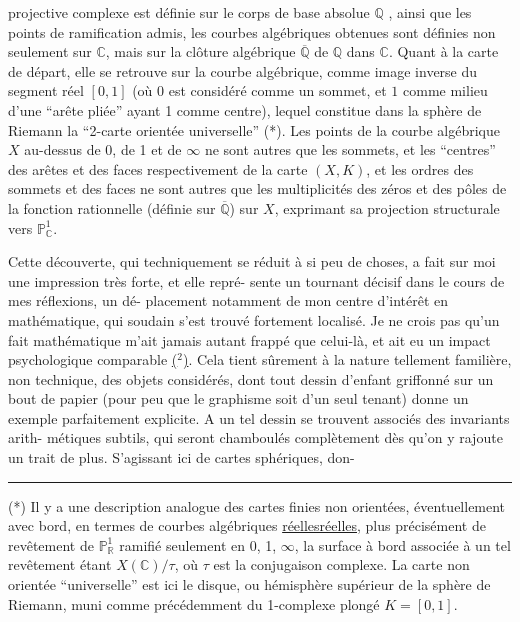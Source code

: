 \documentclass[11pt,a4paper]{article}
\makeatletter
\newif\ifdiplomatic
\newif\ifreading
\def\CurrentApparatus{}
\newcounter{appnote}
\let\TextUline\uline
\renewcommand{\uline}[1]{\ifmmode\underline{#1}\else\TextUline{#1}\fi}
\newcommand{\AppItem}[2]{%
  \ifcsdef{edvariant@#2}{%
    \ifcsempty{edvariant@#2}{\PackageError{Esquisse}{Empty apparatus entry #2}{Every executed apparatus marker requires its printed note.}}{}%
  }{\PackageError{Esquisse}{Undefined apparatus entry #2}{Every executed apparatus marker requires its printed note.}}%
  \typeout{EDITION-APP-ENTRY: #2; NUMBER: #1}%
  \par\noindent\textsuperscript{#1}\csname edvariant@#2\endcsname}
\newcommand{\EditionApp}[1]{%
  \stepcounter{appnote}%
  \ifmmode{}^{\scriptscriptstyle\theappnote}\else\textsuperscript{\theappnote}\fi
  \begingroup\edef\x{\endgroup\noexpand\gappto\noexpand\CurrentApparatus{\noexpand\AppItem{\theappnote}{#1}}}\x}
\newcommand{\var}[4]{\ifdiplomatic#1\else#2\ifreading\else\EditionApp{#4}\fi\fi}
\newcommand{\notecall}[3]{\hypertarget{#2}{\hyperlink{note-#1}{#3}}}
\makeatother
\begin{document}
projective complexe est définie sur le corps de base absolue $\mathbb{Q}$ ,
ainsi que les points de ramification admis, les courbes algébriques
obtenues sont définies non seulement sur $\mathbb{C}$, mais sur la clôture
algébrique $\overline{\mathbb{Q}}$ de $\mathbb{Q}$ dans $\mathbb{C}$. Quant à la carte de départ, elle se
retrouve sur la courbe algébrique, comme image inverse du segment
réel $[0,1]$ (où $0$ est considéré comme un sommet, et $1$ comme
milieu d'une ``arête pliée'' ayant 1 comme centre), lequel constitue
dans la sphère de Riemann la ``2-carte orientée universelle'' (*).
Les points de la courbe algébrique $X$ au-dessus de 0, de 1 et de $\infty$
ne sont autres que les sommets, et les ``centres'' des arêtes et des
faces respectivement de la carte $(X,K)$, et les ordres des sommets
et des faces ne sont autres que les multiplicités des zéros et
des pôles de la fonction rationnelle (définie sur $\overline{\mathbb{Q}}$) sur $X$,
exprimant sa projection structurale vers $\mathbb{P}^1_{\mathbb{C}}$.

Cette découverte, qui techniquement se réduit à si peu
de choses, a fait sur moi une impression très forte, et elle repré-%
sente un tournant décisif dans le cours de mes réflexions, un dé-%
placement notamment de mon centre d'intérêt en mathématique, qui
soudain s'est trouvé fortement localisé. Je ne crois pas qu'un
fait mathématique m'ait jamais autant frappé que celui-là, et ait
eu un impact psychologique comparable \notecall{copy1-2}{call-esq_119_014-2-1}{($^2$)}. Cela tient sûrement à la
nature tellement familière, non technique, des objets considérés,
dont tout dessin d'enfant griffonné sur un bout de papier (pour peu
que le graphisme soit d'un seul tenant) donne un exemple parfaitement
explicite. A un tel dessin se trouvent associés des invariants arith-%
métiques subtils, qui seront chamboulés complètement dès qu'on y
rajoute un trait de plus. S'agissant ici de cartes sphériques, don-%

\noindent\rule{4cm}{0.4pt}

(*) Il y a une description analogue des cartes finies non orientées,
éventuellement avec bord, en termes de courbes algébriques \uline{réelles},
plus précisément de revêtement de $\mathbb{P}^1_{\mathbb{R}}$ \var{ramifié seulement on}{ramifié seulement en}{slip corrected}{V-FR-014-001} 0, 1, $\infty$,
la surface à bord associée à un tel revêtement étant $X(\mathbb{C})/\tau$, où $\tau$
est la conjugaison complexe. La carte non orientée ``universelle'' est
ici le disque, ou hémisphère supérieur de la sphère de Riemann, muni
comme précédemment du 1-complexe plongé $K = [0,1]$.
\end{document}
